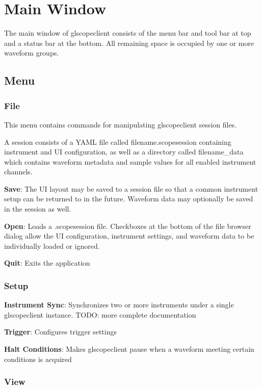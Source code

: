 \chapter{Main Window}

The main window of glscopeclient consists of the menu bar and tool bar at top and a status bar at the bottom. All
remaining space is occupied by one or more waveform groups.

\section{Menu}

\subsection{File}

This menu contains commands for manipulating glscopeclient session files.

A session consists of a YAML file called filename.scopesession containing instrument and UI configuration, as well
as a directory called filename\_data which contains waveform metadata and sample values for all enabled instrument
channels.

\textbf{Save}: The UI layout may be saved to a session file so that a common instrument setup can be returned to in the
future. Waveform data may optionally be saved in the session as well.

\textbf{Open}: Loads a .scopesession file. Checkboxes at the bottom of the file browser dialog allow the UI
configuration, instrument settings, and waveform data to be individually loaded or ignored.

\textbf{Quit}: Exits the application

\subsection{Setup}

\textbf{Instrument Sync}: Synchronizes two or more instruments under a single glscopeclient instance. TODO: more
complete documentation

\textbf{Trigger}: Configures trigger settings

\textbf{Halt Conditions}: Makes glscopeclient pause when a waveform meeting certain conditions is acquired

\subsection{View}


